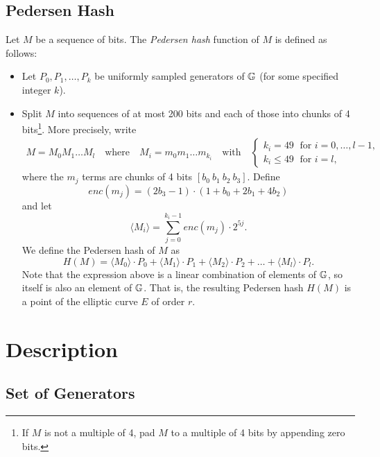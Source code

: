 \documentclass{article}
\begin{document}
\begin{spacing}{1.2}
	\subsection{Pedersen Hash}
	Let $M$ be a sequence of bits. The {\it Pedersen hash} function of $M$ is defined as follows:
	\begin{itemize}
		\item Let $P_0,P_1,\dots,P_k$ be uniformly sampled generators of $\mathbb{G}$ (for some specified integer $k$). 
		\item   Split $M$ into sequences of at most 200 bits and each of those into chunks of 4 bits{\footnote{If $M$ is not a multiple of 4, pad $M$ to a multiple of 4 bits by appending zero bits.}}. 
		More precisely, write  
			\begin{gather*}
				M = M_0M_1\dots M_l 
				\quad\text{where}\quad
				M_i = m_0m_1\dots m_{k_i}
				\quad\text{with}\quad 
				\begin{cases}
				k_i = 49 	\;\text{ for }  i = 0, \dots, l-1, \\
				k_i \leq 49 \;\text{ for }  i = l,
				\end{cases}
			\end{gather*}
		where the $m_j$ terms are chunks of 4 bits $[b_0\: b_1\: b_2\: b_3]$. 
		Define  
			$$ enc(m_j) = (2b_3-1) 
			\cdot (1+b_{0}+2b_{1}+4b_{2}) $$
		and let 
			$$ \langle M_i \rangle = \sum_{j=0}^{k_i-1} enc(m_j) \cdot 2^{5j}.	$$
		We define the Pedersen hash of $M$ as
			\begin{equation}
				\label{eq-ped}
				H(M) = \langle M_0 \rangle \cdot P_0 
				+  \langle M_1 \rangle \cdot P_1 
				+  \langle M_2 \rangle \cdot P_2 
				+ \dots + \langle M_l \rangle \cdot P_l.	
			\end{equation}
		Note that the expression above is a linear combination of elements of $\mathbb{G}$, so itself is also an element of $\mathbb{G}$. That is, the resulting Pedersen hash $H(M)$ is a point of the elliptic curve $E$ of order $r$.
	\end{itemize}

\section{Description}

	\subsection{Set of Generators}
	

\end{spacing}
\end{document}
